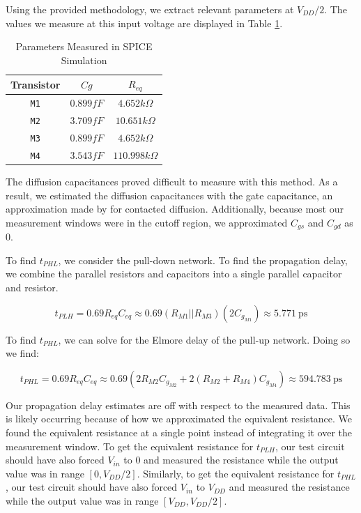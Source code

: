 \documentclass{article}
\begin{document}
	Using the provided methodology, we extract relevant parameters at $V_{DD}/2$. The values we measure at this input voltage are displayed in Table \ref{table::nor_gate_eq_params}.
	
	\begin{table}[H]
	\begin{center}
	\caption{Parameters Measured in SPICE Simulation}
	\label{table::nor_gate_eq_params}
	\begin{tabular}{| c | c | c |}
		\hline
		Transistor & $Cg$ & $R_{eq}$ \\
		\hline	
		\texttt{M1} & $0.899fF$ & $4.652k\Omega$ \\
		\hline
		\texttt{M2} & $3.709fF$ & $10.651k\Omega$ \\
		\hline
		\texttt{M3} & $0.899fF$ & $4.652k\Omega$ \\
		\hline
		\texttt{M4} & $3.543fF$ & $110.998k\Omega$ \\
		\hline
	\end{tabular}	
	\end{center}
	\end{table}
	
	\noindent The diffusion capacitances proved difficult to measure with this method. As a result, we estimated the diffusion capacitances with the gate capacitance, an approximation made by \cite{cmos_vlsi_design} for contacted diffusion. Additionally, because most our measurement windows were in the cutoff region, we approximated $C_{gs}$ and $C_{gd}$ as 0. 
	
	To find $t_{PHL}$, we consider the pull-down network. To find the propagation delay, we combine the parallel resistors and capacitors into a single parallel capacitor and resistor.
	
	\begin{equation}
		t_{PLH} = 0.69R_{eq}C_{eq} \approx 0.69(R_{M1}||R_{M3})(2C_{g_{M1}}) \approx 5.771\ \text{ps}
	\end{equation}
	
	\noindent To find $t_{PHL}$, we can solve for the Elmore delay of the pull-up network. Doing so we find:
	
	\begin{equation}
		t_{PHL} = 0.69R_{eq}C_{eq} \approx 0.69(2R_{M2}C_{g_{M2}} + 2(R_{M2} + R_{M4})C_{g_{M4}})\approx 594.783\ \text{ps}
	\end{equation}
	
	Our propagation delay estimates are off with respect to the measured data. This is likely occurring because of how we approximated the equivalent resistance. We found the equivalent resistance at a single point instead of integrating it over the measurement window. To get the equivalent resistance for $t_{PLH}$, our test circuit should have also forced $V_{in}$ to $0$ and measured the resistance while the output value was in range $[0, V_{DD}/2]$. Similarly, to get the equivalent resistance for $t_{PHL}$, our test circuit should have also forced $V_{in}$ to $V_{DD}$ and measured the resistance while the output value was in range $[V_{DD}, V_{DD}/2]$.
	
\end{document}
